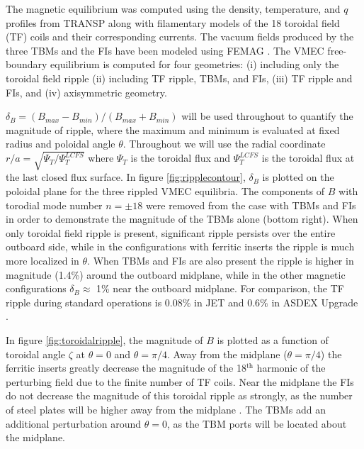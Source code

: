\documentclass{article}
\begin{document}
The magnetic equilibrium was computed using the density, temperature, and $q$ profiles from TRANSP along with filamentary models of the 18 toroidal field (TF) coils and their corresponding currents. The vacuum fields produced by the three TBMs and the FIs have been modeled using FEMAG \cite{Shinohara2009}. The VMEC free-boundary equilibrium \cite{Hirshman1986} is computed for four geometries: (i) including only the toroidal field ripple (ii) including TF ripple, TBMs, and FIs, (iii) TF ripple and FIs, and (iv) axisymmetric geometry.  

$\delta_B = (B_{max}-B_{min})/(B_{max} + B_{min})$ will be used throughout to quantify the magnitude of ripple, where the maximum and minimum is evaluated at fixed radius and poloidal angle $\theta$. Throughout we will use the radial coordinate $r/a = \sqrt{\Psi_T/\Psi_T^{LCFS}}$ where $\Psi_T$ is the toroidal flux and $\Psi_T^{LCFS}$ is the toroidal flux at the last closed flux surface. In figure \ref{fig:ripplecontour}, $\delta_B$ is plotted on the poloidal plane for the three rippled VMEC equilibria. The components of $B$ with torodial mode number $n = \pm 18$ were removed from the case with TBMs and FIs in order to demonstrate the magnitude of the TBMs alone (bottom right). When only toroidal field ripple is present, significant ripple persists over the entire outboard side, while in the configurations with ferritic inserts the ripple is much more localized in $\theta$. When TBMs and FIs are also present the ripple is higher in magnitude (1.4\%) around the outboard midplane, while in the other magnetic configurations $\delta_B \approx$ 1\% near the outboard midplane. For comparison, the TF ripple during standard operations is $0.08\%$ in JET \cite{DeVries2008} and $0.6\%$ in ASDEX Upgrade \cite{Martitsch2016}. 

In figure \ref{fig:toroidalripple}, the magnitude of $B$ is plotted as a function of toroidal angle $\zeta$ at $\theta = 0$ and $\theta = \pi/4$. Away from the midplane ($\theta = \pi/4$) the ferritic inserts greatly decrease the magnitude of the 18$^{\text{th}}$ harmonic of the perturbing field due to the finite number of TF coils. Near the midplane the FIs do not decrease the magnitude of this toroidal ripple as strongly, as the number of steel plates will be higher away from the midplane \cite{Shinohara2009}. The TBMs add an additional perturbation around $\theta = 0$, as the TBM ports will be located about the midplane. 

\FloatBarrier
\end{document}
